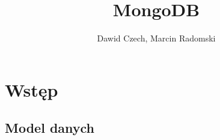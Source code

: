 \documentclass[10pt,a4paper]{article}
\author{Dawid Czech, Marcin Radomski}
\title{MongoDB}
\begin{document}
\maketitle
\newpage

\section{Wstęp}
\subsection{Model danych}
\end{document}
